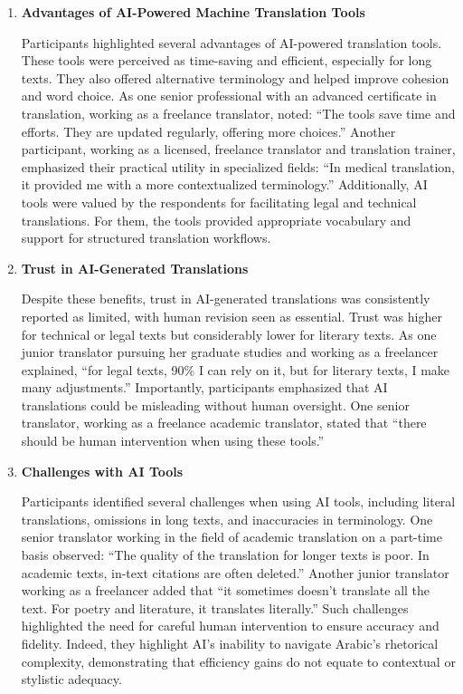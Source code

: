 \documentclass[english]{textolivre}
\begin{document}
\begin{enumerate}
    \item \textbf{Advantages of AI-Powered Machine Translation Tools}

    Participants highlighted several advantages of AI-powered translation tools. These tools were perceived as time-saving and efficient, especially for long texts. They also offered alternative terminology and helped improve cohesion and word choice. As one senior professional with an advanced certificate in translation, working as a freelance translator, noted: “The tools save time and efforts. They are updated regularly, offering more choices.” Another participant, working as a licensed, freelance translator and translation trainer, emphasized their practical utility in specialized fields: “In medical translation, it provided me with a more contextualized terminology.” Additionally, AI tools were valued by the respondents for facilitating legal and technical translations. For them, the tools provided appropriate vocabulary and support for structured translation workflows.

    \item \textbf{Trust in AI-Generated Translations}

    Despite these benefits, trust in AI-generated translations was consistently reported as limited, with human revision seen as essential. Trust was higher for technical or legal texts but considerably lower for literary texts. As one junior translator pursuing her graduate studies and working as a freelancer explained, “for legal texts, 90\% I can rely on it, but for literary texts, I make many adjustments.” Importantly, participants emphasized that AI translations could be misleading without human oversight. One senior translator, working as a freelance academic translator, stated that “there should be human intervention when using these tools.”

    \item \textbf{Challenges with AI Tools}

    Participants identified several challenges when using AI tools, including literal translations, omissions in long texts, and inaccuracies in terminology. One senior translator working in the field of academic translation on a part-time basis observed: “The quality of the translation for longer texts is poor. In academic texts, in-text citations are often deleted.” Another junior translator working as a freelancer added that “it sometimes doesn’t translate all the text. For poetry and literature, it translates literally.” Such challenges highlighted the need for careful human intervention to ensure accuracy and fidelity. Indeed, they highlight AI’s inability to navigate Arabic’s rhetorical complexity, demonstrating that efficiency gains do not equate to contextual or stylistic adequacy.


\end{enumerate}
\end{document}
